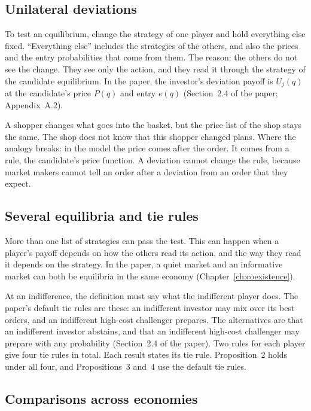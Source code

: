 \subsection{Unilateral deviations}

To test an equilibrium, change the strategy of one player and hold everything else fixed. ``Everything else''
includes the strategies of the others, and also the prices and the entry probabilities that come from them. The
reason: the others do not see the change. They see only the action, and they read it through the strategy of the
candidate equilibrium. In the paper, the investor's deviation payoff is \(U_j(q)\) at the candidate's price
\(P(q)\) and entry \(e(q)\) (Section~2.4 of the paper; Appendix~A.2).

\begin{analogy}
A shopper changes what goes into the basket, but the price list of the shop stays the same. The shop does not
know that this shopper changed plans. Where the analogy breaks: in the model the price comes after the order. It
comes from a rule, the candidate's price function. A deviation cannot change the rule, because market makers cannot
tell an order after a deviation from an order that they expect.
\end{analogy}

\subsection{Several equilibria and tie rules}

More than one list of strategies can pass the test. This can happen when a player's payoff depends on how the
others read its action, and the way they read it depends on the strategy. In the paper, a quiet market and an informative
market can both be equilibria in the same economy (Chapter~\ref{ch:coexistence}).

At an indifference, the definition must say what the indifferent player does. The paper's default tie rules are
these: an indifferent investor may mix over its best orders, and an indifferent high-cost challenger prepares. The
alternatives are that an indifferent investor abstains, and that an indifferent high-cost challenger may prepare
with any probability (Section~2.4 of the paper). Two rules for each player give four tie rules in total. Each
result states its tie rule. Proposition~2 holds under all four, and Propositions~3 and~4 use the default tie
rules.

\subsection{Comparisons across economies}

